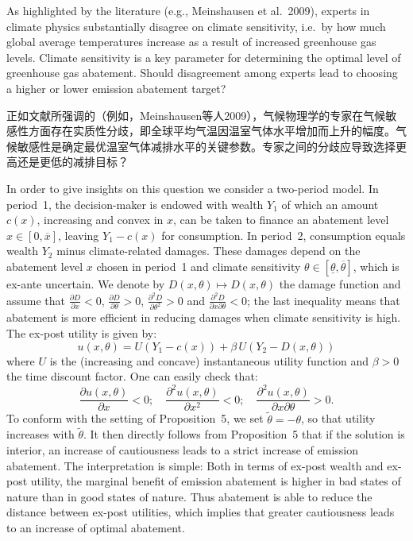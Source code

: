 \documentclass[12pt,a4paper]{article}
\newenvironment{original}
  {\par\noindent\ignorespaces}
  {\par}
\newenvironment{translation}
  {\par\noindent{\color{transblue}\ignorespaces}}
  {\par\medskip}
\begin{document}
\begin{original}
As highlighted by the literature (e.g., Meinshausen et al.\ 2009), experts in climate physics substantially disagree on climate sensitivity, i.e.\ by how much global average temperatures increase as a result of increased greenhouse gas levels. Climate sensitivity is a key parameter for determining the optimal level of greenhouse gas abatement. Should disagreement among experts lead to choosing a higher or lower emission abatement target?
\end{original}

\begin{translation}
正如文献所强调的（例如，Meinshausen等人2009），气候物理学的专家在气候敏感性方面存在实质性分歧，即全球平均气温因温室气体水平增加而上升的幅度。气候敏感性是确定最优温室气体减排水平的关键参数。专家之间的分歧应导致选择更高还是更低的减排目标？
\end{translation}

\begin{original}
In order to give insights on this question we consider a two-period model. In period~1, the decision-maker is endowed with wealth $Y_{1}$ of which an amount $c(x)$, increasing and convex in $x$, can be taken to finance an abatement level $x \in [0, \overline{x}]$, leaving $Y_{1} - c(x)$ for consumption. In period~2, consumption equals wealth $Y_{2}$ minus climate-related damages. These damages depend on the abatement level $x$ chosen in period~1 and climate sensitivity $\theta \in [\underline{\theta}, \overline{\theta}]$, which is ex-ante uncertain. We denote by $D(x, \theta) \mapsto D(x, \theta)$ the damage function and assume that $\frac{\partial D}{\partial x} < 0$, $\frac{\partial D}{\partial \theta} > 0$, $\frac{\partial^{2} D}{\partial \theta^{2}} > 0$ and $\frac{\partial^{2} D}{\partial x \partial \theta} < 0$; the last inequality means that abatement is more efficient in reducing damages when climate sensitivity is high. The ex-post utility is given by:
\[
u(x, \theta) = U(Y_{1} - c(x)) + \beta \, U(Y_{2} - D(x, \theta))
\]
where $U$ is the (increasing and concave) instantaneous utility function and $\beta > 0$ the time discount factor. One can easily check that:
\[
\frac{\partial u(x,\theta)}{\partial x} < 0; \quad \frac{\partial^{2} u(x,\theta)}{\partial x^{2}} < 0; \quad \frac{\partial^{2} u(x,\theta)}{\partial x \partial \theta} > 0.
\]
To conform with the setting of Proposition~5, we set $\tilde{\theta} = -\theta$, so that utility increases with $\tilde{\theta}$. It then directly follows from Proposition~5 that if the solution is interior, an increase of cautiousness leads to a strict increase of emission abatement. The interpretation is simple: Both in terms of ex-post wealth and ex-post utility, the marginal benefit of emission abatement is higher in bad states of nature than in good states of nature. Thus abatement is able to reduce the distance between ex-post utilities, which implies that greater cautiousness leads to an increase of optimal abatement.
\end{original}
\end{document}
